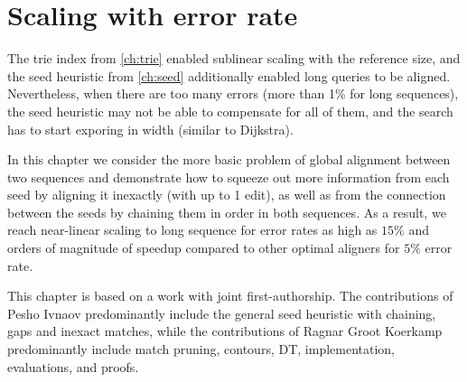 \chapter{Scaling with error rate} \label{ch:global}

\graphicspath{{\dir/}}

The trie index from \cref{ch:trie} enabled sublinear scaling with the reference
size, and the seed heuristic from \cref{ch:seed} additionally enabled long
queries to be aligned. Nevertheless, when there are too many errors (more than
1\% for long sequences), the seed heuristic may not be able to compensate for
all of them, and the search has to start exporing in width (similar to
Dijkstra).

In this chapter we consider the more basic problem of global alignment between
two sequences and demonstrate how to squeeze out more information from each seed
by aligning it inexactly (with up to 1 edit), as well as from the connection
between the seeds by chaining them in order in both sequences. As a result, we
reach near-linear scaling to long sequence for error rates as high as $15\%$ and
orders of magnitude of speedup compared to other optimal aligners for $5\%$
error rate. 

This chapter is based on a work with joint first-authorship. The contributions
of Pesho Ivnaov predominantly include the general seed heuristic with chaining,
gaps and inexact matches, while the contributions of Ragnar Groot Koerkamp
predominantly include match pruning, contours, DT, implementation, evaluations,
and proofs.

%
%
%
%
%







